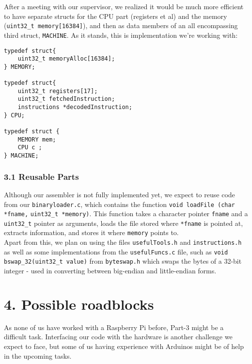 \documentclass[a4paper, twoside]{report}
\begin{document}
After a meeting with our supervisor, we realized it would be much more efficient to have separate structs for the CPU part (registers et al) and the memory (\verb|uint32_t memory[16384]|), and then as data members of an all encompassing third struct, \verb|MACHINE|. As it stands, this is implementation we're working with: 

\begin{lstlisting} 
typedef struct{
    uint32_t memoryAlloc[16384];
} MEMORY;

typedef struct{
    uint32_t registers[17];
    uint32_t fetchedInstruction;
    instructions *decodedInstruction;
} CPU;

typedef struct {
    MEMORY mem;
    CPU c ;
} MACHINE;

\end{lstlisting}


\subsubsection*{3.1 Reusable Parts}

Although our assembler is not fully implemented yet, we expect to reuse code from our \verb|binaryloader.c|, which contains the function \verb|void loadFile (char *fname,| \verb|uint32_t *memory)|. This function takes a character pointer \verb|fname| and a \verb|uint32_t| pointer as arguments, loads the file stored where \verb|*fname| is pointed at, extracts information, and stores it where \verb|memory| points to. \\
Apart from this, we plan on using the files \verb|usefulTools.h| and \verb|instructions.h| as well as some implementations from the \verb|usefulFuncs.c| file, such as \verb|void bswap_32(uint32_t value)| from \verb|byteswap.h| which swaps the bytes of a 32-bit integer - used in converting between big-endian and little-endian forms.


\section*{}

\section*{4. Possible roadblocks}
As none of us have worked with a Raspberry Pi before, Part-3 might be a difficult task. Interfacing our code with the hardware is another challenge we expect to face, but some of us having experience with Arduinos might be of help in the upcoming tasks.\\
\end{document}

